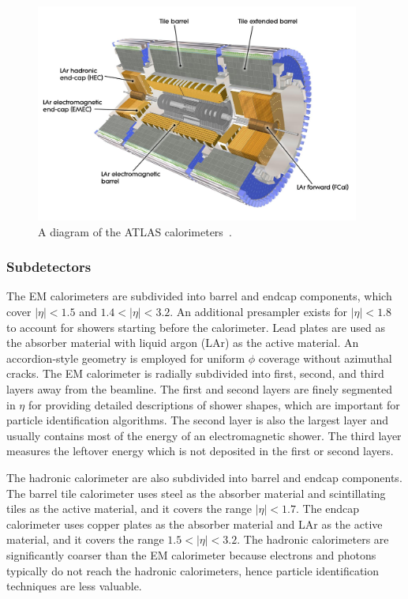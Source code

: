 \begin{figure}[tp]
  \centering
  \includegraphics[width=0.95\textwidth]{figures/lhc-atlas/detector-calorimeters}
  \caption{A diagram of the ATLAS calorimeters~\cite{cern-jinst-atlas}.}
  \label{fig:atlas-detector-calorimeters}
\end{figure}

\subsubsection{Subdetectors}

The EM calorimeters are subdivided into barrel and endcap components, which cover $|\eta| < 1.5$ and $1.4 < |\eta| < 3.2$. An additional presampler exists for $|\eta| < 1.8$ to account for showers starting before the calorimeter. Lead plates are used as the absorber material with liquid argon (LAr) as the active material. An accordion-style geometry is employed for uniform $\phi$ coverage without azimuthal cracks. The EM calorimeter is radially subdivided into first, second, and third layers away from the beamline. The first and second layers are finely segmented in $\eta$ for providing detailed descriptions of shower shapes, which are important for particle identification algorithms. The second layer is also the largest layer and usually contains most of the energy of an electromagnetic shower. The third layer measures the leftover energy which is not deposited in the first or second layers. 

The hadronic calorimeter are also subdivided into barrel and endcap components. The barrel tile calorimeter uses steel as the absorber material and scintillating tiles as the active material, and it covers the range $|\eta| < 1.7$. The endcap calorimeter uses copper plates as the absorber material and LAr as the active material, and it covers the range $1.5 < |\eta| < 3.2$. The hadronic calorimeters are significantly coarser than the EM calorimeter because electrons and photons typically do not reach the hadronic calorimeters, hence particle identification techniques are less valuable.

